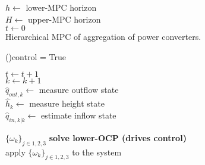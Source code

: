 \begin{algorithm}
	\KwSet $h \leftarrow$ lower-MPC horizon\\
	\KwSet $H \leftarrow$ upper-MPC horizon\\
	\KwSet $t \leftarrow 0$ \\
	\caption{Hierarchical MPC of aggregation of power converters.}\label{alg:two}
	\While(){control = True}{
		$t \leftarrow t+1$ \\
		$k \leftarrow k+1$ \\
		$\hat{q}_{out,k}\leftarrow$  measure outflow state \\
		$\hat{h}_{k}\leftarrow$  measure height state \\
		$\hat{q}_{in, k|k} \leftarrow$ estimate inflow state \\
		
	
	$\{\omega_{k}\}_{j \in {1,2,3}}$ \textbf{solve lower-OCP (drives control)} \\ 
	apply $\{\omega_{k}\}_{j \in {1,2,3}}$ to the system
	}
	

\end{algorithm}